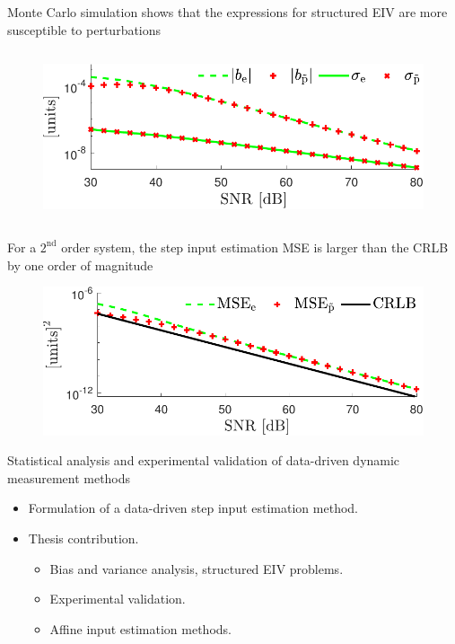 \documentclass[presentation]{beamer}
\begin{document}
\begin{frame}[label={slide:statistical8}]{Monte Carlo simulation shows that the expressions for structured EIV  are more susceptible to perturbations}
\begin{columns}
\begin{column}{0.65\columnwidth}
\begin{figure}
  \centering
  \includegraphics[width=1\columnwidth]{./fig/Stat_Fig_1s.pdf} 
 \end{figure}
\end{column}
\end{columns}
\end{frame}

\begin{frame}[label={slide:statistical10}]{For a $2^{\text{nd}}$ order system, the step input estimation MSE is larger than the CRLB by one order of magnitude}
\begin{figure}
 \centering
 \includegraphics[width=0.65\columnwidth]{./fig/Stat_Fig_3.pdf} 
\end{figure}
\end{frame}

\begin{frame}[label={slides:preview}]{Statistical analysis and experimental validation \linebreak of data-driven dynamic measurement methods}
\begin{itemize}
	\color{gray}
	\item Formulation of a data-driven step input estimation method.
	\vspace{0.5cm}
	\color{black}
	\item Thesis contribution.
	\begin{itemize}
		\color{gray}
		\item Bias and variance analysis, structured EIV problems.
		\color{black}
		\item Experimental validation.
		\color{gray}
		\item Affine input estimation methods.
 	\end{itemize}
\end{itemize}
\end{frame}
\end{document}
